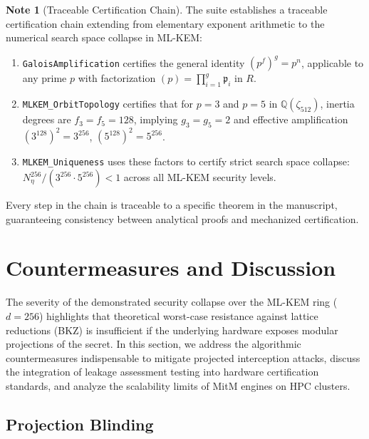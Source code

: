 \documentclass[11pt,a4paper]{article}
\theoremstyle{plain}
\theoremstyle{definition}
\newtheorem{remark}[teorema]{Note}
\numberwithin{equation}{section}
\newcommand{\QQ}{\mathbb{Q}}
\newcommand{\fkp}{\mathfrak{p}}
\begin{document}
\begin{remark}[Traceable Certification Chain]
\label{rem:cadena_certificacion}
The suite establishes a traceable certification chain extending from elementary exponent arithmetic to the numerical search space collapse in ML-KEM:
\begin{enumerate}
    \item \texttt{GaloisAmplification} certifies the general identity $(p^f)^g = p^n$, applicable to any prime $p$ with factorization $(p) = \prod_{i=1}^g \fkp_i$ in $R$.
    \item \texttt{MLKEM\_OrbitTopology} certifies that for $p = 3$ and $p = 5$ in $\QQ(\zeta_{512})$, inertia degrees are $f_3 = f_5 = 128$, implying $g_3 = g_5 = 2$ and effective amplification $(3^{128})^2 = 3^{256}$, $(5^{128})^2 = 5^{256}$.
    \item \texttt{MLKEM\_Uniqueness} uses these factors to certify strict search space collapse: $N_\eta^{256}/(3^{256} \cdot 5^{256}) < 1$ across all ML-KEM security levels.
\end{enumerate}
Every step in the chain is traceable to a specific theorem in the manuscript, guaranteeing consistency between analytical proofs and mechanized certification.
\end{remark}

\section{Countermeasures and Discussion}
\label{sec:discusion_contramedidas}

The severity of the demonstrated security collapse over the ML-KEM ring ($d=256$) highlights that theoretical worst-case resistance against lattice reductions (BKZ) is insufficient if the underlying hardware exposes modular projections of the secret. In this section, we address the algorithmic countermeasures indispensable to mitigate projected interception attacks, discuss the integration of leakage assessment testing into hardware certification standards, and analyze the scalability limits of MitM engines on HPC clusters.

\subsection{Projection Blinding}
\label{subsec:blindaje_proyectivo}
\end{document}
